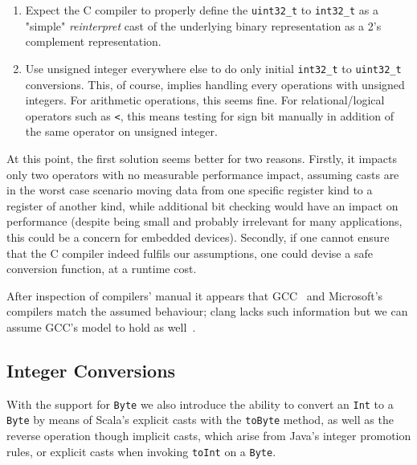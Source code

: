 \documentclass[a4paper,twoside]{article}
\newcommand{\InlineC}[1]{\lstinline[language=C99]|#1|}
\newcommand{\InlineS}[1]{\lstinline[language=Leon]|#1|}
\begin{document}
\begin{enumerate}

\item Expect the C compiler to properly define the \InlineC{uint32_t} to
\InlineC{int32_t} as a "simple" \emph{reinterpret} cast of the underlying binary
representation as a 2's complement representation.

\item Use unsigned integer everywhere else to do only initial \InlineC{int32_t}
to \InlineC{uint32_t} conversions. This, of course, implies handling every
operations with unsigned integers. For arithmetic operations, this seems fine.
For relational/logical operators such as \InlineC{<}, this means testing for
sign bit manually in addition of the same operator on unsigned integer.

\end{enumerate}

At this point, the first solution seems better for two reasons. Firstly, it
impacts only two operators with no measurable performance impact, assuming casts
are in the worst case scenario moving data from one specific register kind to a
register of another kind, while additional bit checking would have an impact on
performance (despite being small and probably irrelevant for many applications,
this could be a concern for embedded devices). Secondly, if one cannot ensure
that the C compiler indeed fulfils our assumptions, one could devise a safe
conversion function, at a runtime cost.

After inspection of compilers' manual it appears that GCC~\cite{gccID} and
Microsoft's~\cite{msvcID} compilers match the assumed behaviour; clang lacks
such information but we can assume GCC's model to hold as well~\cite{clangID}.


\subsection{Integer Conversions}
\label{casts}

With the support for \InlineS{Byte} we also introduce the ability to convert an
\InlineS{Int} to a \InlineS{Byte} by means of Scala's explicit casts with the
\InlineS{toByte} method, as well as the reverse operation though implicit casts,
which arise from Java's integer promotion rules, or explicit casts when invoking
\InlineS{toInt} on a \InlineS{Byte}.
\end{document}
